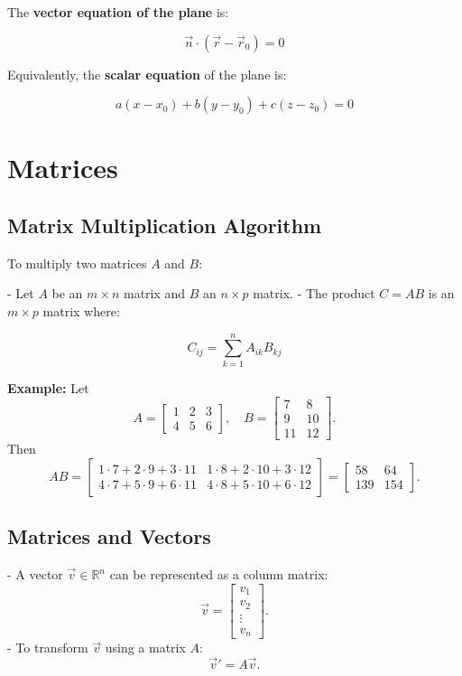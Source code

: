\documentclass{article}
\begin{document}
\begin{multicols}{2}
The \textbf{vector equation of the plane} is:

\[
\vec{n} \cdot (\vec{r} - \vec{r}_0) = 0
\]

Equivalently, the \textbf{scalar equation} of the plane is:

\[
a(x - x_0) + b(y - y_0) + c(z - z_0) = 0
\]

\section*{Matrices}

\subsection*{Matrix Multiplication Algorithm}
To multiply two matrices $ A $ and $ B $:

- Let $ A $ be an $ m \times n $ matrix and $ B $ an $ n \times p $ matrix.
- The product $ C = AB $ is an $ m \times p $ matrix where:

\[
C_{ij} = \sum_{k=1}^n A_{ik} B_{kj}
\]

\textbf{Example:} Let
\[
A = \begin{bmatrix}1 & 2 & 3\\4 & 5 & 6\end{bmatrix},
\quad
B = \begin{bmatrix}7 & 8\\9 & 10\\11 & 12\end{bmatrix}.
\]
Then
\[
AB = \begin{bmatrix}
1\cdot7 + 2\cdot9 + 3\cdot11 & 1\cdot8 + 2\cdot10 + 3\cdot12\\
4\cdot7 + 5\cdot9 + 6\cdot11 & 4\cdot8 + 5\cdot10 + 6\cdot12
\end{bmatrix}
= \begin{bmatrix}58 & 64\\139 & 154\end{bmatrix}.
\]

\subsection*{Matrices and Vectors}
- A vector $\vec{v} \in \mathbb{R}^n$ can be represented as a column matrix:
\[
\vec{v} = \begin{bmatrix} v_1 \\ v_2 \\ \vdots \\ v_n \end{bmatrix}.
\]
- To transform $\vec{v}$ using a matrix $A$:
\[
\vec{v}' = A\vec{v}.
\]


\end{multicols}
\end{document}

